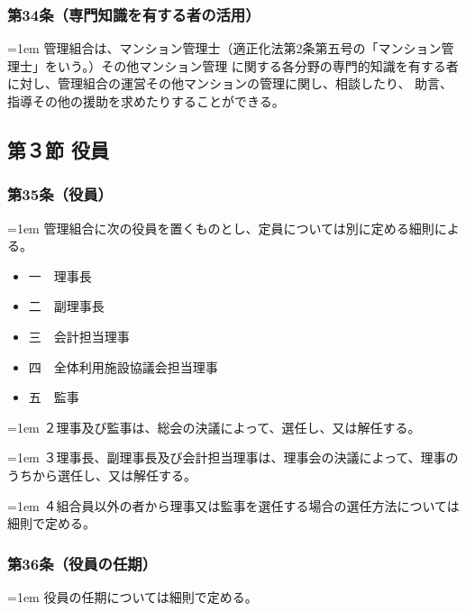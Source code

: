 \documentclass[
  twoside,
  luatex,
  paper=a4paper,
  fontsize=11pt,
  jafontsize=11pt,
  jlreq_notes,
]{jlreq}
\newcommand{\joumain}[1]{%
  \noindent\hangindent=1em\hangafter=1
  \hspace{1em}#1%
}
\newcommand{\kou}[2]{%
  \par\noindent\hangindent=1em\hangafter=1
  #1\hspace{1em}#2%
}
\begin{document}
  \subsubsection*{第34条（専門知識を有する者の活用）}
  \joumain{管理組合は、マンション管理士（適正化法第2条第五号の「マンション管理士」をいう。）その他マンション管理
  に関する各分野の専門的知識を有する者に対し、管理組合の運営その他マンションの管理に関し、相談したり、
  助言、指導その他の援助を求めたりすることができる。}
  
  \begin{center}
  \subsection*{第３節 役員}
  \end{center}

  \subsubsection*{第35条（役員）}
  \joumain{管理組合に次の役員を置くものとし、定員については別に定める細則による。}
  \begin{itemize}[label={}, leftmargin=3em, itemindent=-2em]
    \item 一　理事長
    \item 二　副理事長
    \item 三　会計担当理事
    \item 四　全体利用施設協議会担当理事
    \item 五　監事
  \end{itemize}
  \kou{２}{理事及び監事は、総会の決議によって、選任し、又は解任する。}
  \kou{３}{理事長、副理事長及び会計担当理事は、理事会の決議によって、理事のうちから選任し、又は解任する。}
  \kou{４}{組合員以外の者から理事又は監事を選任する場合の選任方法については細則で定める。}

  \subsubsection*{第36条（役員の任期）}
  \joumain{役員の任期については細則で定める。}
  
\end{document}
